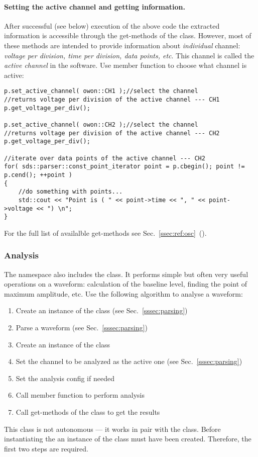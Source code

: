\paragraph{Setting the active channel and getting information.}
After successful (see below) execution of the above
code the extracted information is
accessible through the get-methods of the  class. However, most of these
methods are intended to provide information about \emph{individual} channel:
\emph{voltage per division, time per division, data points, etc}. This channel is
called the \emph{active channel} in the software.
Use  member function to choose what channel is active:

\begin{lstlisting}
p.set_active_channel( owon::CH1 );//select the channel
//returns voltage per division of the active channel --- CH1
p.get_voltage_per_div();

p.set_active_channel( owon::CH2 );//select the channel
//returns voltage per division of the active channel --- CH2
p.get_voltage_per_div();

//iterate over data points of the active channel --- CH2
for( sds::parser::const_point_iterator point = p.cbegin(); point != p.cend(); ++point )
{
    //do something with points...
    std::cout << "Point is ( " << point->time << ", " << point->voltage << ") \n";
}
\end{lstlisting}
For the full list of availalble get-methods see Sec.~\ref{ssec:ref:osc}~().

\subsubsection{Analysis}\label{sssec:anal}
The  namespace also includes the  class. It performs simple
but often very useful operations on a waveform: calculation of the baseline level, finding
the point of maximum amplitude, etc. Use the following algorithm to analyse a waveform: 

\begin{enumerate}
    \item Create an instance of the  class (see Sec.~\ref{sssec:parsing})
    \item Parse a waveform (see Sec.~\ref{sssec:parsing})        
    \item Create an instance of the  class 
    \item Set the channel to be analyzed as the active one (see Sec.~\ref{sssec:parsing})
    \item Set the analysis config if needed 
    \item Call  member function to perform analysis 
    \item Call get-methods of the  class to get the results
    \label{algo:anal}
\end{enumerate}
This class is not autonomous --- it works in pair with the  class. Before
instantiating the  an instance of the  class must have been
created. Therefore, the first two steps are required.

